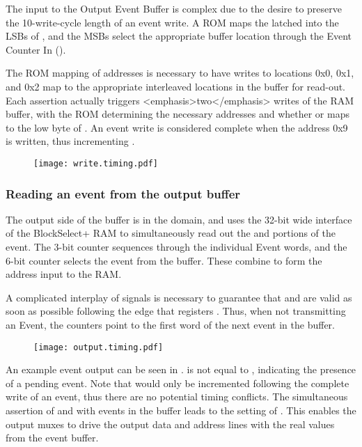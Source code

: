The input to the Output Event Buffer is complex due to the desire to
preserve the 10-write-cycle length of an event write. A ROM maps the
latched  into the LSBs of
, and the MSBs select the appropriate
buffer location through the Event Counter In
().
        
The ROM mapping of addresses is necessary to have writes to locations
0x0, 0x1, and 0x2 map to the appropriate interleaved locations in the
buffer for read-out.  Each  assertion actually
triggers <emphasis>two</emphasis> writes of the RAM buffer, with the
ROM determining the necessary addresses and whether
 or  maps to the
low byte of . An event write is considered
complete when the address 0x9 is written, thus incrementing
.
        

\begin{figure}
\texttt{[image: write.timing.pdf]}
\end{figure}                  
                
\subsubsection{Reading an event from the output buffer}
The output side of the buffer is in the 
domain, and uses the 32-bit wide interface of the BlockSelect+ RAM to
simultaneously read out the  and
 portions of the event. The 3-bit
 counter sequences through the individual
Event words, and the 6-bit  counter
selects the event from the buffer. These combine to form the address
input  to the RAM.
   
A complicated interplay of signals is necessary to guarantee that
 and  are valid
as soon as possible following the  edge that
registers . Thus, when not transmitting an Event,
the counters point to the first word of the next event in the buffer.

\begin{figure}
\texttt{[image: output.timing.pdf]}
\end{figure}                  

An example event output can be seen in . 
is not equal to , indicating the presence of a
pending event. Note that  would only be
incremented following the complete write of an event, thus there are
no potential timing conflicts. The simultaneous assertion of
 and  with events in the
buffer leads to the setting of .  This enables
the output muxes to drive the output data and address lines with the
real values from the event buffer.

